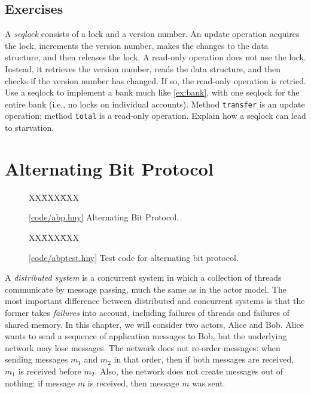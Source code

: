 \documentclass{report}
\newcommand{\harmonysource}[1]{
\begin{tabbing}
XX\=XXX\=XXX\kill
    
\end{tabbing}
}
\newcommand{\harmonylink}[1]{%
[\href{https://harmony.cs.cornell.edu/#1}{\underline{#1}}]%
}
\newenvironment{code}{
\tcolorbox
}{
\endtcolorbox
}
\begin{document}
\section*{Exercises}
\begin{problems}
\item A \emph{seqlock}
%
consists of a lock and a version number.
An update operation acquires the lock, increments the version number, makes the
changes to the data structure, and then releases the lock.  A read-only operation
does not use the lock.  Instead, it retrieves the version number,
reads the data structure, and then checks if the
version number has changed.  If so, the read-only operation is retried.
Use a seqlock to implement a bank much like \autoref{ex:bank}, with
one seqlock for the entire bank (i.e., no locks on individual accounts).
Method \texttt{transfer} is an update operation; method \texttt{total} is a
read-only operation.  Explain how a seqlock can lead to starvation.
\end{problems}

\chapter{Alternating Bit Protocol}
\label{ch:abp}
%
%
%

\begin{figure}
\begin{code}
\harmonysource{abp}
\end{code}
\caption{\harmonylink{code/abp.hny} Alternating Bit Protocol.}
\label{fig:abp}
\end{figure}

\begin{figure}
\begin{code}
\harmonysource{abptest}
\end{code}
\caption{\harmonylink{code/abptest.hny} Test code for alternating bit protocol.}
\label{fig:abptest}
\end{figure}

A
\emph{distributed system}
%
is a concurrent system in which a collection
of threads communicate by message passing, much the same as
in the actor model.
The most important difference between distributed and concurrent
systems is that the former takes \emph{failures}
%
into account,
including failures of threads and failures of shared memory.
In this chapter, we will consider two actors, Alice and Bob.
Alice wants to send a sequence of application messages to Bob,
but the underlying network may lose messages.
%
The network does not re-order messages: when sending messages
$m_1$ and $m_2$ in that order, then if both messages are received,
$m_1$ is received before $m_2$.
Also, the network does not create messages out of nothing: if
message $m$ is received, then message $m$ was sent.
\end{document}
